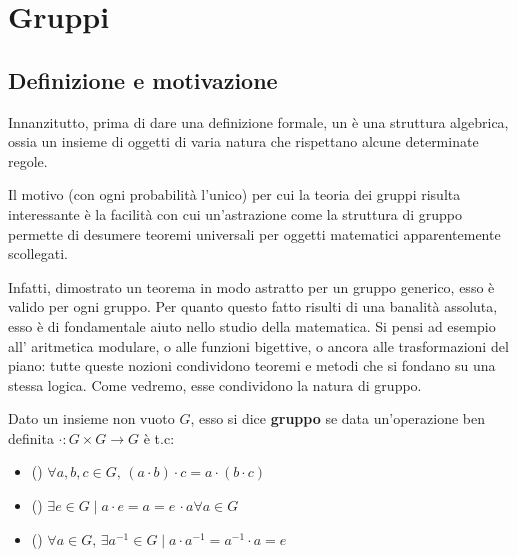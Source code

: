 \section{Gruppi}

\subsection{Definizione e motivazione}

Innanzitutto, prima di dare una definizione formale, un
 è una struttura algebrica, ossia un insieme
di oggetti di varia natura che rispettano alcune determinate
regole.

Il motivo (con ogni probabilità l'unico) per cui la teoria dei
gruppi risulta interessante è la facilità con cui un'astrazione
come la struttura di gruppo permette di desumere teoremi universali
per oggetti matematici apparentemente scollegati.

Infatti, dimostrato un teorema in modo astratto per un gruppo
generico, esso è valido per ogni gruppo. Per quanto questo
fatto risulti di una banalità assoluta, esso è di fondamentale
aiuto nello studio della matematica. Si pensi ad esempio all'
aritmetica modulare, o alle funzioni bigettive, o ancora
alle trasformazioni del piano: tutte queste nozioni condividono
teoremi e metodi che si fondano su una stessa logica. Come vedremo,
esse condividono la natura di gruppo.

\begin{definition}
    Dato un insieme non vuoto $G$, esso si dice \textbf{gruppo} se data
    un'operazione ben definita $\cdot : G \times G \to G$ è t.c:

    \begin{itemize}
        \item () $\forall a, b, c \in G, \, (a \cdot b) \cdot c = a \cdot (b \cdot c)$
        \item () $\exists e \in G \mid a \cdot e = a = e \, \cdot a \forall a \in G$
        \item () $\forall a \in G, \, \exists a^{-1} \in G \mid a \cdot a^{-1} = a^{-1} \cdot a = e$
    \end{itemize}
\end{definition}